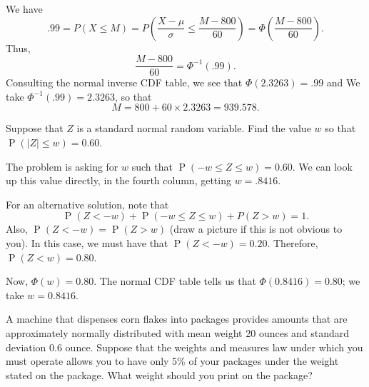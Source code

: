 \documentclass[answers,11pt]{exam}
\DeclareMathOperator*{\Prob}{P}
\renewcommand{\Pr}{\Prob}
\begin{document}
\begin{questions}
\begin{solution}
We have
\[
  .99 = P(X \leq M) = P\left(\frac{X - \mu}{\sigma} \leq \frac{M - 800}{60}\right) =
  \Phi\left(\frac{M - 800}{60}\right).
\]
Thus,
\[
  \frac{M - 800}{60} = \Phi^{-1}(.99).
\]
Consulting the normal inverse CDF table, we see that $\Phi(2.3263) = .99$ and
We take $\Phi^{-1}(.99) = 2.3263$, so that
\[
  M = 800 + 60 \times 2.3263 = 939.578.
\]
\end{solution}



\question Suppose that $Z$ is a standard normal random variable.  %
Find the value $w$ so that $\Pr(|Z| \leq w) = 0.60$.

\begin{solution}
The problem is asking for $w$ such that $\Pr(-w \leq Z \leq w) = 0.60$.  We
can look up this value directly, in the fourth column, getting
$w = .8416$.

For an alternative solution, note that
\[
  \Pr(Z < -w) + \Pr(-w \leq Z \leq w) + P(Z > w) = 1.
\]
Also, $\Pr(Z < -w) = \Pr(Z > w)$ (draw a picture if this is not obvious to you).
In this case, we must have that $\Pr(Z < -w) = 0.20$.  Therefore, $\Pr(Z < w) =
0.80$.

Now, $\Phi(w) = 0.80$.  The normal CDF table tells us that $\Phi(0.8416) =
0.80$; we take $w = 0.8416$.
\end{solution}


%
%
%


\question A machine that dispenses corn flakes into packages provides amounts that are
approximately normally distributed with mean weight 20 ounces and standard
deviation 0.6 ounce.  Suppose that the weights and measures law under which
you must operate allows you to have only 5\% of your packages under the weight
stated on the package.  What weight should you print on the package?


\end{questions}
\end{document}
